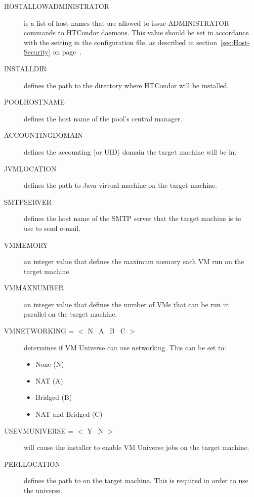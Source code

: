 \begin{description}
\item[HOSTALLOWADMINISTRATOR]
is a list of host names that are allowed to issue ADMINISTRATOR commands to
HTCondor daemons. This value should be set in accordance with the
 setting in the configuration file, 
as described in
section~\ref{sec:Host-Security} on page~\pageref{sec:Host-Security}.

\item[INSTALLDIR]
defines the path to the directory where HTCondor will be installed. 

\item[POOLHOSTNAME]
defines the host name of the pool's central manager. 

\item[ACCOUNTINGDOMAIN] 
defines the accounting (or UID) domain the target machine will be in.

\item[JVMLOCATION]
defines the path to Java virtual machine on the target machine.

\item[SMTPSERVER]
defines the host name of the SMTP server that the target machine is to
use to send e-mail.

\item [VMMEMORY]
an integer value that defines the maximum memory each VM run on the target
machine.

\item [VMMAXNUMBER]
an integer value that defines the number of VMs that can be run in parallel
on the target machine.

\item [VMNETWORKING = $<$ N \Bar\ A \Bar\ B \Bar\ C $>$]
determines if VM Universe can use networking. This can be set to:
\begin{itemize}
\item None (N)
\item NAT (A)
\item Bridged (B)
\item NAT and Bridged (C)
\end{itemize}

\item [USEVMUNIVERSE = $<$ Y \Bar\ N $>$]
will cause the installer to enable VM Universe jobs on the target machine.


\item[PERLLOCATION]
defines the path to  on the target machine. This is required in
order to use the  universe.


\end{description}
